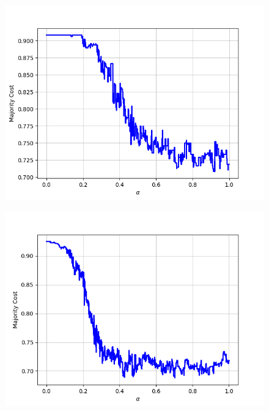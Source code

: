 \begin{figure}[H]
\begin{minipage}{.24\textwidth}
  {\includegraphics[width=\linewidth]{plots/omniglot-intra-sc-cnn/Asomtavruli_(Georgian)}}
\end{minipage}
\begin{minipage}{.24\textwidth}
  \centering
  {\includegraphics[width=\linewidth]{plots/omniglot-intra-sc-cnn/Balinese}}
\end{minipage}
\begin{minipage}{.24\textwidth}
  \centering

\end{minipage}
\end{figure}

